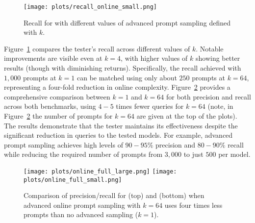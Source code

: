 \begin{figure}[t]
  \texttt{[image: plots/recall\_online\_small.png]}
  \caption{Recall for \bencht with different values of advanced prompt sampling defined with $k$.}
  \label{fig:eval:online_recall}
\end{figure}
Figure~\ref{fig:eval:online_recall} compares the tester's recall across different values of $k$. Notable improvements are visible even at $k=4$, with higher values of $k$ showing better results (though with diminishing returns). Specifically, the recall achieved with $1,000$ prompts at $k=1$ can be matched using only about $250$ prompts at $k=64$, representing a four-fold reduction in online complexity. %
Figure~\ref{fig:eval:online_full} provides
a comprehensive comparison between $k=1$ and $k=64$ for both precision and recall across both benchmarks, using $4-5$ times fewer queries for $k=64$ 
(note, in Figure~\ref{fig:eval:online_full} the number of prompts for $k=64$ are given at the top of the plots). 
The results demonstrate that the tester maintains its effectiveness despite the significant reduction in queries to the tested models. 
For example, advanced prompt sampling achieves high levels of $90-95$\% precision and $80-90$\% recall while reducing the required number of prompts from $3,000$ to just $500$ per model.
\begin{figure}[t]
    \centering
    \subfigure
    {
        \texttt{[image: plots/online\_full\_large.png]}
    }
    \subfigure
    {
        \texttt{[image: plots/online\_full\_small.png]}
    }
    \caption{Comparison of precision/recall for \bencht (top) and \bencht (bottom) when advanced online prompt sampling with $k=64$  uses four times less prompts than no advanced sampling ($k=1$). }
    \label{fig:eval:online_full}
\end{figure}


